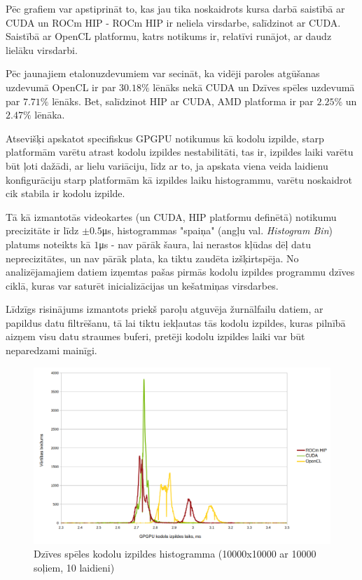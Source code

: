 Pēc grafiem var apstiprināt to, kas jau tika noskaidrots kursa darbā saistībā
ar CUDA un ROCm HIP - ROCm HIP ir neliela virsdarbe, salīdzinot ar
CUDA.\cite{kursa-darbs} Saistībā ar OpenCL platformu, katrs notikums ir,
relatīvi runājot, ar daudz lielāku virsdarbi.

Pēc jaunajiem etalonuzdevumiem var secināt, ka vidēji paroles
atgūšanas uzdevumā OpenCL ir par \(30.18\%\) lēnāks nekā CUDA un Dzīves
spēles uzdevumā par \(7.71\%\) lēnāks. Bet, salīdzinot HIP ar CUDA,
AMD platforma ir par \(2.25\%\) un \(2.47\%\) lēnāka.

Atsevišķi apskatot specifiskus GPGPU notikumus kā kodolu izpilde, starp
platformām varētu atrast kodolu izpildes nestabilitāti, tas ir, izpildes laiki
varētu būt ļoti dažādi, ar lielu variāciju, līdz ar to, ja apskata viena veida
laidienu konfigurāciju starp platformām kā izpildes laiku histogrammu, varētu
noskaidrot cik stabila ir kodolu izpilde.

Tā kā izmantotās videokartes (un CUDA, HIP platformu definētā) notikumu
precizitāte ir līdz \(\pm0.5\)\si{\micro\second}, histogrammas "spaiņa" (angļu
val. \textit{Histogram Bin}) platums noteikts kā \(1\)\si{\micro\second} - nav
pārāk šaura, lai nerastos kļūdas dēļ datu neprecizitātes, un nav pārāk plata, 
ka tiktu zaudēta izšķirtspēja. \cite{Freedman1981} No analizējamajiem datiem
izņemtas pašas pirmās kodolu izpildes programmu dzīves ciklā, kuras var saturēt
inicializācijas un kešatmiņas virsdarbes.

Līdzīgs risinājums izmantots priekš paroļu atguvēja žurnālfailu datiem, ar
papildus datu filtrēšanu, tā lai tiktu iekļautas tās kodolu izpildes, kuras
pilnībā aizņem visu datu straumes buferi, pretēji kodolu izpildes laiki var būt
neparedzami mainīgi.

\begin{figure}[H]
    \centering
    \includegraphics[width=\textwidth]{images/gol_distrib.png}
    \caption{Dzīves spēles kodolu izpildes histogramma (10000x10000 ar 10000 soļiem, 10 laidieni)}
    \label{img:gol_distrib}
\end{figure}


